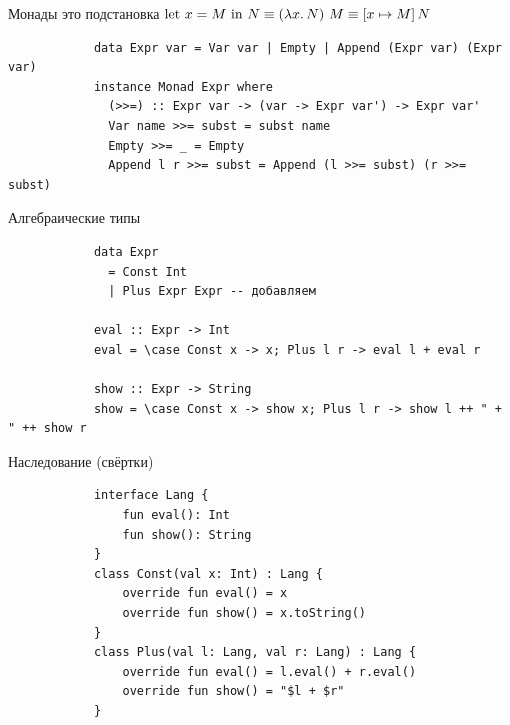     \begin{frame}[fragile]{Монады это подстановка}
        \pause
        $\text{let } x = M \text{ in } N \equiv (\lambda x\ldotp N)\ap M \equiv \subst{N}{x}{M}$
        \pause\vspace{1em}
        \begin{verbatim}
            data Expr var = Var var | Empty | Append (Expr var) (Expr var)
            instance Monad Expr where
              (>>=) :: Expr var -> (var -> Expr var') -> Expr var'
              Var name >>= subst = subst name
              Empty >>= _ = Empty
              Append l r >>= subst = Append (l >>= subst) (r >>= subst)
        \end{verbatim}
    \end{frame}


    \begin{frame}[fragile]{Алгебраические типы}
        \pause
        \begin{verbatim}
            data Expr
              = Const Int
              | Plus Expr Expr -- добавляем

            eval :: Expr -> Int
            eval = \case Const x -> x; Plus l r -> eval l + eval r

            show :: Expr -> String
            show = \case Const x -> show x; Plus l r -> show l ++ " + " ++ show r
        \end{verbatim}
    \end{frame}

    \begin{frame}[fragile]{Наследование (свёртки)}
        \pause
        \begin{verbatim}
            interface Lang {
                fun eval(): Int
                fun show(): String
            }
            class Const(val x: Int) : Lang {
                override fun eval() = x
                override fun show() = x.toString()
            }
            class Plus(val l: Lang, val r: Lang) : Lang {
                override fun eval() = l.eval() + r.eval()
                override fun show() = "$l + $r"
            }
        \end{verbatim}
    \end{frame}

